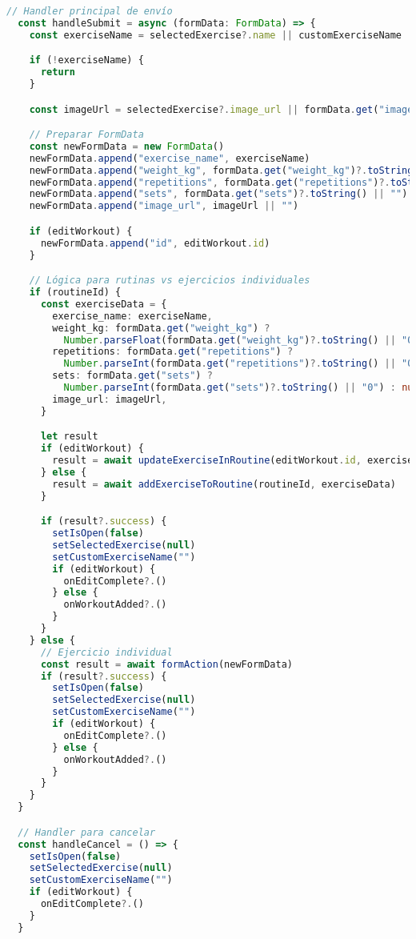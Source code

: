 \documentclass[12pt,a4paper]{article}
\begin{document}
\begin{lstlisting}[language=typescript, caption=components/gym/workout-form.tsx - Estructura principal]
  // Handler principal de envío
  const handleSubmit = async (formData: FormData) => {
    const exerciseName = selectedExercise?.name || customExerciseName

    if (!exerciseName) {
      return
    }

    const imageUrl = selectedExercise?.image_url || formData.get("image_url")?.toString() || null

    // Preparar FormData
    const newFormData = new FormData()
    newFormData.append("exercise_name", exerciseName)
    newFormData.append("weight_kg", formData.get("weight_kg")?.toString() || "")
    newFormData.append("repetitions", formData.get("repetitions")?.toString() || "")
    newFormData.append("sets", formData.get("sets")?.toString() || "")
    newFormData.append("image_url", imageUrl || "")

    if (editWorkout) {
      newFormData.append("id", editWorkout.id)
    }

    // Lógica para rutinas vs ejercicios individuales
    if (routineId) {
      const exerciseData = {
        exercise_name: exerciseName,
        weight_kg: formData.get("weight_kg") ? 
          Number.parseFloat(formData.get("weight_kg")?.toString() || "0") : null,
        repetitions: formData.get("repetitions") ? 
          Number.parseInt(formData.get("repetitions")?.toString() || "0") : null,
        sets: formData.get("sets") ? 
          Number.parseInt(formData.get("sets")?.toString() || "0") : null,
        image_url: imageUrl,
      }

      let result
      if (editWorkout) {
        result = await updateExerciseInRoutine(editWorkout.id, exerciseData)
      } else {
        result = await addExerciseToRoutine(routineId, exerciseData)
      }

      if (result?.success) {
        setIsOpen(false)
        setSelectedExercise(null)
        setCustomExerciseName("")
        if (editWorkout) {
          onEditComplete?.()
        } else {
          onWorkoutAdded?.()
        }
      }
    } else {
      // Ejercicio individual
      const result = await formAction(newFormData)
      if (result?.success) {
        setIsOpen(false)
        setSelectedExercise(null)
        setCustomExerciseName("")
        if (editWorkout) {
          onEditComplete?.()
        } else {
          onWorkoutAdded?.()
        }
      }
    }
  }

  // Handler para cancelar
  const handleCancel = () => {
    setIsOpen(false)
    setSelectedExercise(null)
    setCustomExerciseName("")
    if (editWorkout) {
      onEditComplete?.()
    }
  }


\end{lstlisting}
\end{document}
